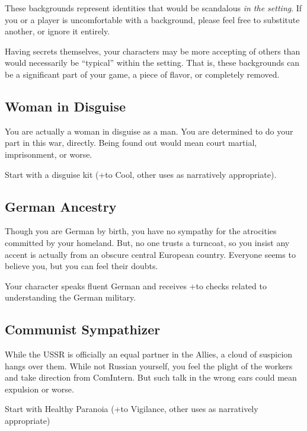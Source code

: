 \documentclass{book}
\newcommand{\bbb}{\BoostDie }
\begin{document}
\begin{multicols}{2}
These backgrounds represent identities that would be scandalous \emph{in the setting}.  If you or a player is uncomfortable with a background, please feel free to substitute another, or ignore it entirely.

Having secrets themselves, your characters may be more accepting of others than would necessarily be ``typical'' within the setting.  That is, these backgrounds can be a significant part of your game, a piece of flavor, or completely removed.

\subsection{Woman in Disguise}

You are actually a woman in disguise as a man.  You are determined to do your part in this war, directly.  Being found out would mean court martial, imprisonment, or worse.

Start with a disguise kit (+\bbb to Cool, other uses as narratively appropriate).

\subsection{German Ancestry}

Though you are German by birth, you have no sympathy for the atrocities committed by your homeland.  But, no one trusts a turncoat, so you insist any accent is actually from an obscure central European country.  Everyone seems to believe you, but you can feel their doubts.

Your character speaks fluent German and receives +\bbb to checks related to understanding the German military.

\subsection{Communist Sympathizer}

While the USSR is officially an equal partner in the Allies, a cloud of suspicion hangs over them.  While not Russian yourself, you feel the plight of the workers and take direction from ComIntern.  But such talk in the wrong ears could mean expulsion or worse.

Start with Healthy Paranoia (+\bbb to Vigilance, other uses as narratively appropriate)

%
%


\end{multicols}
\end{document}
